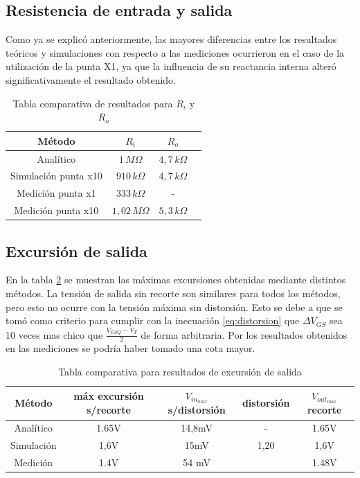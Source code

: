 \documentclass[10pt,spanish,a4paper,notitlepage]{article}
\begin{document}
\subsection{Resistencia de entrada y salida}
Como ya se explicó anteriormente, las mayores diferencias entre los resultados teóricos y simulaciones con respecto a las mediciones ocurrieron en el caso de la utilización de la punta X1, ya que la influencia de su reactancia interna alteró significativamente el resultado obtenido.

\begin{table}[H]
\centering
\begin{tabular}{|c|c|c|c|} 
\hline
Método & $R_i$ &$R_o$ \\ \hline
Analítico & $1\,\unit{M\Omega}$ & $4,7\,\unit{k\Omega}$ \\ \hline
Simulación punta x10 & $910\,\unit{k\Omega}$ & $4,7\,\unit{k\Omega}$ \\ \hline
Medición punta x1 & $333\,\unit{k\Omega}$ & - \\ \hline
Medición punta x10 & $1,02\,\unit{M\Omega}$ & $5,3\,\unit{k\Omega}$ \\ \hline %
\end{tabular}
\caption{Tabla comparativa de resultados para $R_i$ y $R_o$}
\label{table:compResistencias}
\end{table}

\subsection{Excursión de salida}

En la tabla \ref{table:compexcursion} se muestran las máximas excursiones obtenidas mediante
distintos métodos. La tensión de salida sin recorte son similares para todos los métodos, pero
esto no ocurre con la tensión máxima sin distorsión. Esto se debe a que se tomó como criterio
para cumplir con la inecuación \ref{eq:distorsion} que $\Delta V_{GS}$ sea 10 veces
mas chico que $\frac{V_{GSQ}-V_T}{2}$ de forma arbitraria. Por los resultados obtenidos
en las mediciones se podría haber tomado una cota mayor.

\begin{table}[H]
\centering
\begin{tabular}{|c|c|c|c|c|} 
\hline
Método & máx excursión s/recorte & $V_{in_{max}}$ s/distorsión &distorsión &$V_{out_{max}}$ recorte\\ \hline
Analítico & 1.65V &14,8mV& - &1.65V \\ \hline
Simulación & 1,6V&15mV &1,20&1,6V \\ \hline
Medición &1.4V  &54 mV & &1.48V\\ \hline
\end{tabular}
\caption{Tabla comparativa para resultados de excursión de salida}
\label{table:compexcursion}
\end{table}
\end{document}
